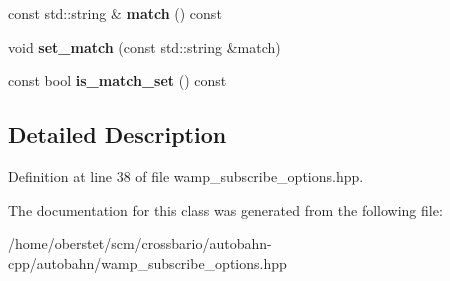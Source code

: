 \begin{DoxyCompactItemize}
\item 
const std\+::string \& {\bfseries match} () const \hypertarget{classautobahn_1_1wamp__subscribe__options_a34147a3c7076835a18346d1fd5a5e124}{}\label{classautobahn_1_1wamp__subscribe__options_a34147a3c7076835a18346d1fd5a5e124}

\item 
void {\bfseries set\+\_\+match} (const std\+::string \&match)\hypertarget{classautobahn_1_1wamp__subscribe__options_a88e32ec78d8ff8e168473c5b59f9fdc5}{}\label{classautobahn_1_1wamp__subscribe__options_a88e32ec78d8ff8e168473c5b59f9fdc5}

\item 
const bool {\bfseries is\+\_\+match\+\_\+set} () const \hypertarget{classautobahn_1_1wamp__subscribe__options_a0e0ae508776f57eb490adaa84bc45867}{}\label{classautobahn_1_1wamp__subscribe__options_a0e0ae508776f57eb490adaa84bc45867}

\end{DoxyCompactItemize}


\subsection{Detailed Description}


Definition at line 38 of file wamp\+\_\+subscribe\+\_\+options.\+hpp.



The documentation for this class was generated from the following file\+:\begin{DoxyCompactItemize}
\item 
/home/oberstet/scm/crossbario/autobahn-\/cpp/autobahn/wamp\+\_\+subscribe\+\_\+options.\+hpp\end{DoxyCompactItemize}
